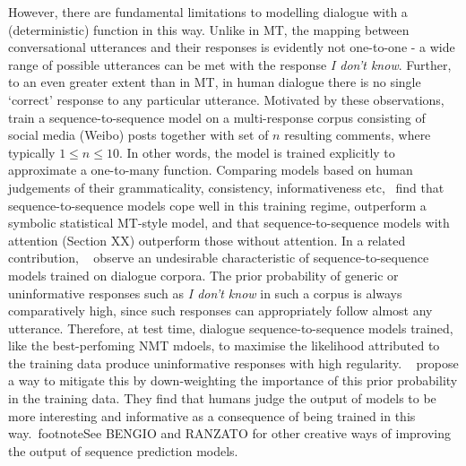 \documentclass[11pt,letterpaper]{article}
\begin{document}
However, there are fundamental limitations to modelling dialogue with a (deterministic) function in this way. Unlike in MT, the mapping between conversational utterances and their responses is evidently not one-to-one - a wide range of possible utterances can be met with the response \emph{I don't know}. Further, to an even greater extent than in MT, in human dialogue there is no single `correct' response to any particular utterance. Motivated by these observations,~\cite{shang2015neural} train a sequence-to-sequence model on a multi-response corpus consisting of social media (Weibo) posts together with set of \(n\) resulting comments, where typically \( 1 \leq n \leq 10\). In other words, the model is trained explicitly to approximate a one-to-many function. Comparing models based on human judgements of their grammaticality, consistency, informativeness etc,~\cite{shang2015neural} find that sequence-to-sequence models cope well in this training regime, outperform a symbolic statistical MT-style model, and that sequence-to-sequence models with attention (Section XX) outperform those without attention. In a related contribution, ~ observe an undesirable characteristic of sequence-to-sequence models trained on dialogue corpora. The prior probability of generic or uninformative responses such as \emph{I don't know} in such a corpus is always comparatively high, since such responses can appropriately follow almost any utterance. Therefore, at test time, dialogue sequence-to-sequence models trained, like the best-perfoming NMT mdoels, to maximise the likelihood attributed to the training data produce uninformative responses with high regularity. ~ propose a way to mitigate this by down-weighting the importance of this prior probability in the training data. They find that humans judge the output of models to be more interesting and informative as a consequence of being trained in this way.~footnote{See BENGIO and RANZATO for other creative ways of improving the output of sequence prediction models}. 	
\end{document}
